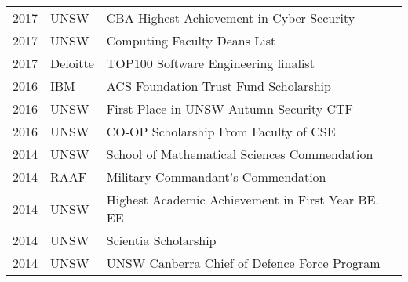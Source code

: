 \documentclass[letterpaper]{deedy-resume} %
\begin{document}
\begin{minipage}[t]{0.65\textwidth}
\begin{tabular}{rll}
2017 & UNSW & CBA Highest Achievement in Cyber Security \\
2017 & UNSW & Computing Faculty Deans List \\
2017 & Deloitte & TOP100 Software Engineering finalist \\
2016 & IBM &  ACS Foundation Trust Fund Scholarship \\
2016 & UNSW & First Place in UNSW Autumn Security CTF \\
2016 & UNSW & CO-OP Scholarship From Faculty of CSE\\
2014 & UNSW & School of Mathematical Sciences Commendation\\
2014 & RAAF & Military Commandant's Commendation\\
2014 & UNSW & Highest Academic Achievement in First Year BE. EE\\
2014 & UNSW & Scientia Scholarship\\
2014 & UNSW & UNSW Canberra Chief of Defence Force Program\\
\end{tabular}

\sectionspace %


%



\end{minipage} %

\end{document}
